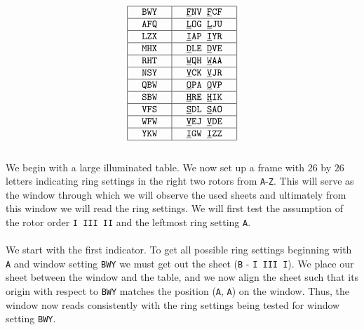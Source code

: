 \[
	\setlength{\arraycolsep}{15pt}
	\begin{array}{|c | c|}
		\hline
		\texttt{BWY} & \texttt{}{\uline{\texttt{F}}}\texttt{NV }{\uline{\texttt{F}}}\texttt{CF} \\
		\hline
		\texttt{AFQ} & \texttt{}{\uline{\texttt{L}}}\texttt{OG }{\uline{\texttt{L}}}\texttt{JU} \\
		\hline
		\texttt{LZX} & \texttt{}{\uline{\texttt{I}}}\texttt{AP }{\uline{\texttt{I}}}\texttt{YR} \\
		\hline
		\texttt{MHX} & \texttt{}{\uline{\texttt{D}}}\texttt{LE }{\uline{\texttt{D}}}\texttt{VE} \\
		\hline
		\texttt{RHT} & \texttt{}{\uline{\texttt{W}}}\texttt{QH }{\uline{\texttt{W}}}\texttt{AA} \\
		\hline
		\texttt{NSY} & \texttt{}{\uline{\texttt{V}}}\texttt{CK }{\uline{\texttt{V}}}\texttt{JR} \\
		\hline
		\texttt{QBW} & \texttt{}{\uline{\texttt{O}}}\texttt{PA }{\uline{\texttt{O}}}\texttt{VP} \\
		\hline
		\texttt{SBW} & \texttt{}{\uline{\texttt{H}}}\texttt{RE }{\uline{\texttt{H}}}\texttt{IK} \\
		\hline
		\texttt{VFS} & \texttt{}{\uline{\texttt{S}}}\texttt{DL }{\uline{\texttt{S}}}\texttt{AO} \\
		\hline
		\texttt{WFW} & \texttt{}{\uline{\texttt{V}}}\texttt{EJ }{\uline{\texttt{V}}}\texttt{DE} \\
		\hline
		\texttt{YKW} & \texttt{}{\uline{\texttt{I}}}\texttt{GW }{\uline{\texttt{I}}}\texttt{ZZ} \\
		\hline
	\end{array}
\]
\\We begin with a large illuminated table. We now set up a frame with $26$ by $26$ letters indicating ring settings in the right two rotors from \texttt{A}-\texttt{Z}. This will serve as the window through which we will observe the used sheets and ultimately from this window we will read the ring settings. We will first test the assumption of the rotor order \texttt{I III II} and the leftmost ring setting \texttt{A}.
\\\\We start with the first indicator. To get all possible ring settings beginning with \texttt{A} and window setting \texttt{BWY} we must get out the sheet (\texttt{B} - \texttt{I III I}). We place our sheet between the window and the table, and we now align the sheet such that its origin with respect to \texttt{BWY} matches the position (\texttt{A}, \texttt{A}) on the window. Thus, the window now reads consistently with the ring settings being tested for window setting \texttt{BWY}.
